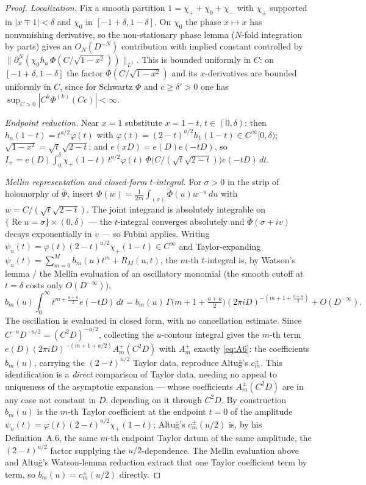 \documentclass[11pt]{article}
\theoremstyle{definition}
\newcommand{\wt}[1]{\widetilde{#1}}
\renewcommand{\Re}{\operatorname{Re}}
\begin{document}
\begin{proof}
\emph{Localization.} Fix a smooth partition $1=\chi_++\chi_0+\chi_-$ with $\chi_\pm$ supported in
$|x\mp1|<\delta$ and $\chi_0$ in $[-1+\delta,1-\delta]$. On $\chi_0$ the phase $x\mapsto x$ has
nonvanishing derivative, so the non-stationary phase lemma \cite[Thm.~7.7.1]{Hormander} ($N$-fold
integration by parts) gives an $O_N(D^{-N})$ contribution with implied constant controlled by
$\|\partial_x^N(\chi_0 h_a\,\Phi(C/\sqrt{1-x^2}))\|_{L^1}$. This is bounded uniformly in $C$: on
$[-1+\delta,1-\delta]$ the factor $\Phi(C/\sqrt{1-x^2})$ and its $x$-derivatives are bounded uniformly
in $C$, since for Schwartz $\Phi$ and $c\ge\delta'>0$ one has $\sup_{C>0}|C^k\Phi^{(k)}(Cc)|<\infty$.

\emph{Endpoint reduction.} Near $x=1$ substitute $x=1-t$, $t\in(0,\delta)$: then
$h_a(1-t)=t^{a/2}\varphi(t)$ with $\varphi(t)=(2-t)^{a/2}h_1(1-t)\in C^\infty[0,\delta)$;
$\sqrt{1-x^2}=\sqrt t\,\sqrt{2-t}$; and $e(xD)=e(D)e(-tD)$, so
$I_+=e(D)\int_0^\delta \chi_+(1-t)\,t^{a/2}\varphi(t)\,\Phi\big(C/(\sqrt t\sqrt{2-t})\big)e(-tD)\,dt$.

\emph{Mellin representation and closed-form $t$-integral.} For $\sigma>0$ in the strip of holomorphy
of $\wt\Phi$, insert $\Phi(w)=\frac1{2\pi i}\int_{(\sigma)}\wt\Phi(u)w^{-u}\,du$ with
$w=C/(\sqrt t\sqrt{2-t})$. The joint integrand is absolutely integrable on
$\{\Re u=\sigma\}\times(0,\delta)$ --- the $t$-integral converges absolutely and $\wt\Phi(\sigma+iv)$
decays exponentially in $v$ --- so Fubini applies. Writing
$\psi_u(t)=\varphi(t)(2-t)^{u/2}\chi_+(1-t)\in C^\infty$ and Taylor-expanding
$\psi_u(t)=\sum_{m=0}^{M}b_m(u)t^m+R_M(u,t)$, the $m$-th $t$-integral is, by Watson's lemma / the
Mellin evaluation of an oscillatory monomial \cite[Ch.~3]{Wong} (the smooth cutoff at $t=\delta$ costs
only $O(D^{-\infty})$),
\[
  b_m(u)\!\int_0^\infty t^{m+\frac{a+u}{2}}e(-tD)\,dt
  = b_m(u)\,\Gamma\!\big(m{+}1{+}\tfrac{a+u}{2}\big)(2\pi iD)^{-(m+1+\frac{a+u}{2})}+O(D^{-\infty}).
\]
The oscillation is evaluated in closed form, with no cancellation estimate. Since
$C^{-u}D^{-u/2}=(C^2D)^{-u/2}$, collecting the $u$-contour integral gives the $m$-th term
$e(D)(2\pi iD)^{-(m+1+a/2)}A^+_m(C^2D)$ with $A^+_m$ exactly \eqref{eq:A6}: the coefficients $b_m(u)$,
carrying the $(2-t)^{u/2}$ Taylor data, reproduce Altu\u{g}'s $c^\pm_m$. This identification is a \emph{direct}
comparison of Taylor data, needing no appeal to uniqueness of the asymptotic expansion --- whose coefficients
$A^\pm_m(C^2D)$ are in any case not constant in $D$, depending on it through $C^2D$. By construction $b_m(u)$ is
the $m$-th Taylor coefficient at the endpoint $t=0$ of the amplitude $\psi_u(t)=\varphi(t)(2-t)^{u/2}\chi_+(1-t)$;
Altu\u{g}'s $c^\pm_m(u/2)$ is, by his Definition~A.6, the same $m$-th endpoint Taylor datum of the same amplitude,
the $(2-t)^{u/2}$ factor supplying the $u/2$-dependence. The Mellin evaluation above and Altu\u{g}'s Watson-lemma
reduction extract that one Taylor coefficient term by term, so $b_m(u)=c^\pm_m(u/2)$ directly.


\end{proof}
\end{document}
